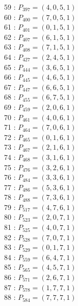 \documentclass{article}
\begin{document}
{\begin{multicols}{3}
59 : $P_{397}=( 4, 0, 5, 1 )$\\
60 : $P_{400}=( 7, 0, 5, 1 )$\\
61 : $P_{401}=( 0, 1, 5, 1 )$\\
62 : $P_{407}=( 6, 1, 5, 1 )$\\
63 : $P_{408}=( 7, 1, 5, 1 )$\\
64 : $P_{427}=( 2, 4, 5, 1 )$\\
65 : $P_{444}=( 3, 6, 5, 1 )$\\
66 : $P_{445}=( 4, 6, 5, 1 )$\\
67 : $P_{447}=( 6, 6, 5, 1 )$\\
68 : $P_{455}=( 6, 7, 5, 1 )$\\
69 : $P_{459}=( 2, 0, 6, 1 )$\\
70 : $P_{461}=( 4, 0, 6, 1 )$\\
71 : $P_{464}=( 7, 0, 6, 1 )$\\
72 : $P_{465}=( 0, 1, 6, 1 )$\\
73 : $P_{467}=( 2, 1, 6, 1 )$\\
74 : $P_{468}=( 3, 1, 6, 1 )$\\
75 : $P_{476}=( 3, 2, 6, 1 )$\\
76 : $P_{484}=( 3, 3, 6, 1 )$\\
77 : $P_{486}=( 5, 3, 6, 1 )$\\
78 : $P_{488}=( 7, 3, 6, 1 )$\\
79 : $P_{517}=( 4, 7, 6, 1 )$\\
80 : $P_{523}=( 2, 0, 7, 1 )$\\
81 : $P_{525}=( 4, 0, 7, 1 )$\\
82 : $P_{528}=( 7, 0, 7, 1 )$\\
83 : $P_{529}=( 0, 1, 7, 1 )$\\
84 : $P_{559}=( 6, 4, 7, 1 )$\\
85 : $P_{565}=( 4, 5, 7, 1 )$\\
86 : $P_{571}=( 2, 6, 7, 1 )$\\
87 : $P_{578}=( 1, 7, 7, 1 )$\\
88 : $P_{584}=( 7, 7, 7, 1 )$\\
\end{multicols}


%


%


}%
\end{document}
